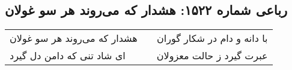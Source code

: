 \begin{center}
\section*{رباعی شماره ۱۵۲۲: هشدار که می‌روند هر سو غولان}
\label{sec:1522}
\begin{longtable}{l p{0.5cm} r}
هشدار که می‌روند هر سو غولان
&&
با دانه و دام در شکار گوران
\\
ای شاد تنی که دامن دل گیرد
&&
عبرت گیرد ز حالت معزولان
\\
\end{longtable}
\end{center}
